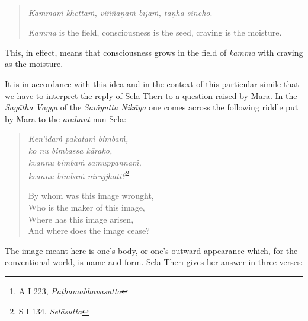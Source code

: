 \begin{quote}
\emph{Kammaṁ khettaṁ, viññāṇaṁ bījaṁ, taṇhā sineho}.\footnote{A I 223, \emph{Paṭhamabhavasutta}}

\emph{Kamma} is the field, consciousness is the seed, craving is the moisture.
\end{quote}

This, in effect, means that consciousness grows in the field of \emph{kamma} with craving as the moisture.

It is in accordance with this idea and in the context of this particular simile that we have to interpret the reply of Selā Therī to a question raised by Māra. In the \emph{Sagātha Vagga} of the \emph{Saṁyutta Nikāya} one comes across the following riddle put by Māra to the \emph{arahant} nun Selā:

\begin{quote}
\emph{Ken'idaṁ pakataṁ bimbaṁ,}\\
\emph{ko nu bimbassa kārako,}\\
\emph{kvannu bimbaṁ samuppannaṁ,}\\
\emph{kvannu bimbaṁ nirujjhati?}\footnote{S I 134, \emph{Selāsutta}}

By whom was this image wrought,\\
Who is the maker of this image,\\
Where has this image arisen,\\
And where does the image cease?
\end{quote}

The image meant here is one's body, or one's outward appearance which, for the conventional world, is name-and-form. Selā Therī gives her answer in three verses:

